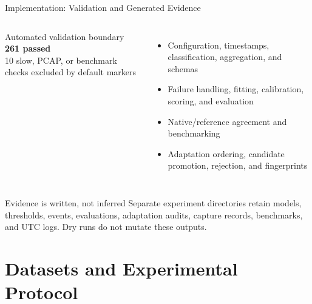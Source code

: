 \documentclass[aspectratio=169,10pt]{beamer}
\begin{document}
\begin{frame}{Implementation: Validation and Generated Evidence}
\begin{columns}[T,onlytextwidth]
\begin{exampleblock}{Automated validation boundary}
\centering
\Huge\textbf{261 passed}\\[0.18cm]
\small 10 slow, PCAP, or benchmark checks excluded by default markers
\end{exampleblock}

\begin{itemize}
  \item Configuration, timestamps, classification, aggregation, and schemas
  \item Failure handling, fitting, calibration, scoring, and evaluation
  \item Native/reference agreement and benchmarking
  \item Adaptation ordering, candidate promotion, rejection, and fingerprints
\end{itemize}
\end{columns}

\vspace{0.35cm}
\begin{block}{Evidence is written, not inferred}
Separate experiment directories retain models, thresholds, events, evaluations,
adaptation audits, capture records, benchmarks, and UTC logs. Dry runs do not
mutate these outputs.
\end{block}
\end{frame}

\section{Datasets and Experimental Protocol}
\end{document}
